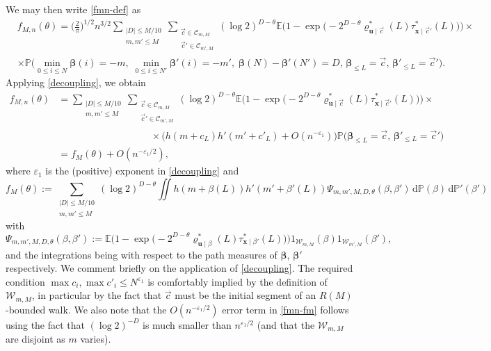 \documentclass[11pt,reqno]{amsart}
\numberwithin{equation}{section}
\theoremstyle{definition}
\theoremstyle{remark}
\newcommand{\mb}{\mathbb}
\newcommand{\mbf}{\mathbf}
\newcommand{\eps}{\varepsilon}
\def\boldbeta{\boldsymbol\beta}
\renewcommand{\le}{\leqslant}
\begin{document}
We may then write \cref{fmn-def} as
\begin{align*}  & f_{M,n}(\theta) = \big(\frac{2}{\pi}\big)^{1/2}n^{3/2}\sum_{\substack{|D| \le M/10 \\ m,m' \le M}}\sum_{\substack{\vec{c} \in \mathscr{C}_{m, M} \\ \vec{c}' \in \mathscr{C}_{m',M}}}   (\log 2)^{
D - \theta}  \mb{E} \big(1 -  \exp \big({-}2^{D - \theta}  \varrho^*_{\mbf{u} \mid \vec{c}}(L) \tau^*_{\mbf{x} \mid \vec{c}'}(L)\big)\big)  \times \\ & \times \mb{P} \big(\min_{0 \le i \le N} \boldbeta(i) = -m,\;  \min_{0 \le i \le N'} \boldbeta'(i) = -m',\;  \boldbeta(N) - \boldbeta'(N') = D,\, \boldbeta_{\le L} = \vec{c}, \, \boldbeta'_{\le L} = \vec{c}'\big).\end{align*} Applying \cref{decoupling}, we obtain
\begin{align} \nonumber f_{M,n}(\theta) & = \sum_{\substack{|D| \le M/10 \\ m,m' \le M}} \sum_{\substack{\vec{c} \in \mathscr{C}_{m, M} \\ \vec{c}' \in \mathscr{C}_{m',M}}}   (\log 2)^{
D - \theta}   \mb{E} \big(1 -  \exp \big({-}2^{D - \theta}  \varrho^*_{\mbf{u} \mid \vec{c}}(L) \tau^*_{\mbf{x} \mid \vec{c}'}(L)\big)\big)  \times \\[-0.5cm] & \hspace{4cm} \times \big(  h(m + c_L) h'(m' + c'_L) + O(n^{- \eps_1})\big) \mb{P}\big( \boldbeta_{ \le L} = \vec{c}, \, \boldbeta'_{\le L} = \vec{c}'\big) \nonumber \\ &  = f_M(\theta) + O(n^{-\eps_1/2}),\label{fmn-fm}\end{align}
where $\eps_1$ is the (positive) exponent in \cref{decoupling} and 
\begin{equation} f_M(\theta) := \sum_{\substack{|D| \le M/10 \\ m,m' \le M }} (\log 2)^{
D - \theta}  \iint h(m + \beta(L)) h'(m' + \beta'(L)) \Psi_{m,m',M,D,\theta}(\beta,\beta')\, \mathrm{d}\mb{P}(\beta) \, \mathrm{d}\mb{P}'(\beta') \label{FM-form}\end{equation}
with
\begin{equation}\label{psi-def} \Psi_{m,m', M,D,\theta}(\beta,\beta') := \mb{E} \big(1 - \exp\big({-}2^{D - \theta}  \varrho^*_{\mbf{u} \mid \beta}(L) \tau^*_{\mbf{x} \mid \beta'}(L)\big)\big) 1_{\mathscr{W}_{m,M}}(\beta)1_{\mathscr{W}_{m',M}}(\beta'),\end{equation} and the integrations being with respect to the path measures of $\boldbeta$, $\boldbeta'$ respectively.
We comment briefly on the application of \cref{decoupling}. The required condition $\max c_i, \max c'_i \le N^{\eps_1}$ is comfortably implied by the definition of $\mathscr{W}_{m, M}$, in particular by the fact that $\vec{c}$ must be the initial segment of an $R(M)$-bounded walk. We also note that the $O(n^{-\eps_1/2})$ error term in \cref{fmn-fm} follows using the fact that $(\log 2)^{-D}$ is much smaller than $n^{\eps_1/2}$ (and that the $\mathscr{W}_{m,M}$ are disjoint as $m$ varies). 
\end{document}
